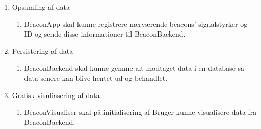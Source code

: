 \begin{enumerate}
	\item Opsamling af data
		\begin{enumerate}
			\item BeaconApp skal kunne registrere nærværende beacons' signalstyrker og ID og sende disse informationer til BeaconBackend.
		\end{enumerate}
		
	\item Persistering af data
		\begin{enumerate}
			\item BeaconBackend skal kunne gemme alt modtaget data i en database så data senere kan blive hentet ud og behandlet.
		\end{enumerate}
		
	\item Grafisk visuliasering af data
	\begin{enumerate}
		\item BeaconVisualiser skal på initialisering af Bruger kunne visualisere data  fra BeaconBackend.
	\end{enumerate}		
\end{enumerate}

